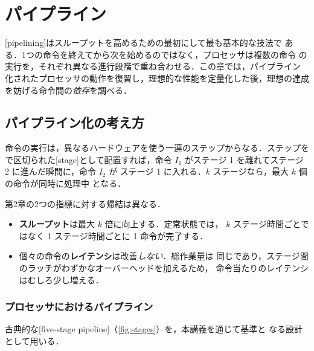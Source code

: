 \documentclass[../main.tex]{subfiles}
\begin{document}
\chapter{パイプライン}

[pipelining]はスループットを高めるための最初にして最も基本的な技法で
ある．1つの命令を終えてから次を始めるのではなく，プロセッサは複数の命令
の実行を，それぞれ異なる進行段階で重ね合わせる．この章では，パイプライン
化されたプロセッサの動作を復習し，理想的な性能を定量化した後，理想の達成
を妨げる命令間の\emph{依存}を調べる．

\section{パイプライン化の考え方}

命令の実行は，異なるハードウェアを使う一連のステップからなる．ステップを
で区切られた[stage]として配置すれば，命令
$I_1$ がステージ 1 を離れてステージ 2 に進んだ瞬間に，命令 $I_2$ が
ステージ 1 に入れる．$k$ ステージなら，最大 $k$ 個の命令が同時に処理中
となる．

第2章の2つの指標に対する帰結は異なる．
\begin{itemize}
  \item \textbf{スループット}は最大 $k$ 倍に向上する．定常状態では，
    $k$ ステージ時間ごとではなく 1 ステージ時間ごとに 1 命令が完了する．
  \item 個々の命令の\textbf{レイテンシ}は改善\emph{しない}．総作業量は
    同じであり，ステージ間のラッチがわずかなオーバーヘッドを加えるため，
    命令当たりのレイテンシはむしろ少し増える．
\end{itemize}

\subsection{プロセッサにおけるパイプライン}

古典的な[five-stage pipeline]（\cref{fig:stages}）を，本講義を通じて基準と
なる設計として用いる．
\end{document}

